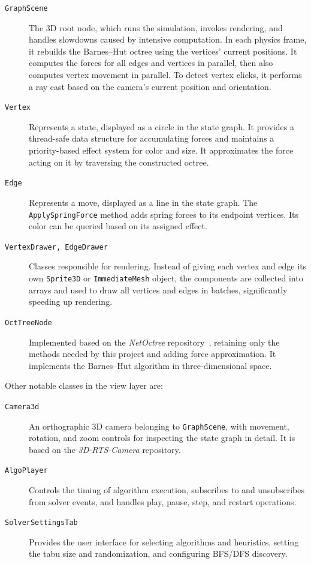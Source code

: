 \begin{description}
    \item[\texttt{GraphScene}] The 3D root node, which runs the simulation, invokes rendering, and handles slowdowns caused by intensive computation. In each physics frame, it rebuilds the Barnes--Hut octree using the vertices' current positions. It computes the forces for all edges and vertices in parallel, then also computes vertex movement in parallel. To detect vertex clicks, it performs a ray cast based on the camera's current position and orientation.
    \item[\texttt{Vertex}] Represents a state, displayed as a circle in the state graph. It provides a thread-safe data structure for accumulating forces and maintains a priority-based effect system for color and size. It approximates the force acting on it by traversing the constructed octree.
    \item[\texttt{Edge}] Represents a move, displayed as a line in the state graph. The \texttt{ApplySpringForce} method adds spring forces to its endpoint vertices. Its color can be queried based on its assigned effect.
    \item[\texttt{VertexDrawer, EdgeDrawer}] Classes responsible for rendering. Instead of giving each vertex and edge its own \texttt{Sprite3D} or \texttt{ImmediateMesh} object, the components are collected into arrays and used to draw all vertices and edges in batches, significantly speeding up rendering.
    \item[\texttt{OctTreeNode}] Implemented based on the \textit{NetOctree} repository~\cite{octree_mcserep}, retaining only the methods needed by this project and adding force approximation. It implements the Barnes--Hut algorithm in three-dimensional space.
\end{description}

Other notable classes in the view layer are:
\begin{description}
\item[\texttt{Camera3d}] An orthographic 3D camera belonging to \texttt{GraphScene}, with movement, rotation, and zoom controls for inspecting the state graph in detail. It is based on the \textit{3D-RTS-Camera} repository.~\cite{3d_rts_camera}
\item[\texttt{AlgoPlayer}] Controls the timing of algorithm execution, subscribes to and unsubscribes from solver events, and handles play, pause, step, and restart operations.
\item[\texttt{SolverSettingsTab}] Provides the user interface for selecting algorithms and heuristics, setting the tabu size and randomization, and configuring BFS/DFS discovery.
\end{description}

